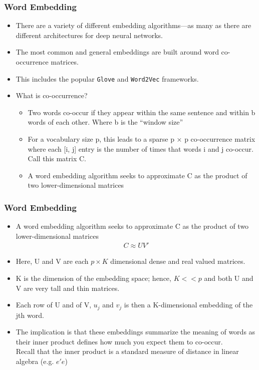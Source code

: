 \documentclass[
  shownotes,
  xcolor={svgnames},
  hyperref={colorlinks,citecolor=DarkBlue,linkcolor=DarkRed,urlcolor=DarkBlue}
  , aspectratio=169]{beamer}
\begin{document}
\begin{frame}
\frametitle{Word Embedding }

\begin{itemize}
\item There are a variety of different embedding algorithms—as many as there are different architectures for deep neural networks. 
\medskip
\item The most common and general embeddings are built around word co-occurrence matrices. 
\medskip
\item This includes the popular \texttt{Glove} and \texttt{Word2Vec} frameworks. 
\medskip
\item What is co-occurrence?
  \begin{itemize}
  \item  Two words co-occur if they appear within the same sentence and within b words of each other. Where b is the “window size”
  \item  For a vocabulary size p, this leads to a sparse p × p co-occurrence matrix where each [i, j] entry is the number of times that words i and j co-occur. Call this matrix C. 
  \item A word embedding algorithm seeks to approximate C as the product of two lower-dimensional matrices
  \end{itemize}
\end{itemize}
 
\end{frame}
\begin{frame}
\frametitle{Word Embedding }

\begin{itemize}
  \item A word embedding algorithm seeks to approximate C as the product of two lower-dimensional matrices
  \begin{align}
  C\approx UV'
  \end{align}

  \item Here, U and V are each $p \times K$ dimensional dense and real valued matrices. 
  \item K is the dimension of the embedding space; hence, $K < < p$ and both U and V are very tall and thin matrices. 
  \item Each row of U and of V, $u_j$ and $v_j$ is then a K-dimensional embedding of the jth word. 
  \item The implication is  that these embeddings summarize the meaning of words as their inner product defines how much you expect them to co-occur. 
  \\
  {\footnotesize Recall that the inner product is a standard measure of distance in linear algebra (e.g. $e'e$)}

  
\end{itemize}

 
\end{frame}
\end{document}
